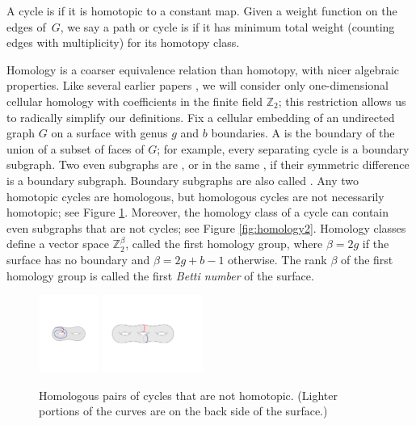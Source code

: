 \documentclass[11pt,twoside]{article}
\def\Z{\mathbb{Z}}
\begin{document}
%
%
A cycle is  if it is homotopic to a constant map.
Given a weight function on the edges of~$G$, we say a path or cycle is  if it has minimum total weight (counting edges with multiplicity) for its homotopy class.

Homology is a coarser equivalence relation than homotopy, with nicer
algebraic properties.  Like several earlier papers \cite{cf-qhc2-07,
cf-qhc-08, dls-chtl-07, dlsc-cgaht-08,e-sncds-11,f-sntcd-13}, we will consider only
one-dimensional cellular homology with coefficients in the finite
field $\Z_2$; this restriction allows us to radically simplify our
definitions.
Fix a cellular embedding of an undirected graph $G$ on a surface with genus $g$ and $b$ boundaries.  A  is the boundary of the union of a subset of faces of $G$; for example, every separating cycle is a boundary subgraph.
Two even subgraphs are , or in the same , if their symmetric difference is a boundary subgraph.
Boundary subgraphs are also called .  Any two homotopic cycles are homologous, but homologous cycles are not necessarily homotopic; see Figure \ref{fig:homology}.  Moreover, the homology class of a cycle can contain even subgraphs that are not cycles; see Figure \ref{fig:homology2}.
Homology classes define a vector space $\Z_2^\beta$, called the first homology group, where $\beta = 2g$ if the surface has no boundary and $\beta = 2g+b-1$ otherwise.
The rank $\beta$ of the first homology group is called the first \emph{Betti number} of the surface.

\begin{figure}[htb]
\centering
\includegraphics[height=1in]{Fig/homologous3}\qquad
\includegraphics[height=1in]{Fig/homologous2}
\caption{Homologous pairs of cycles that are not homotopic.  (Lighter portions of the curves are on the back side of the surface.)}
\label{fig:homology}
\end{figure}
\end{document}
